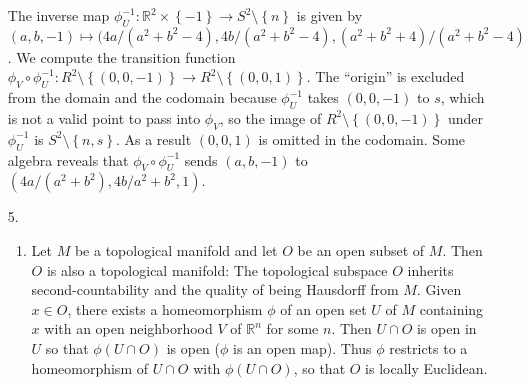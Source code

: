 \documentclass[11pt,leqno]{article}
\theoremstyle{plain}
\theoremstyle{definition}
\numberwithin{equation}{section}
\numberwithin{lem}{section}
\newcommand{\cbr}[1]{\left\{#1\right\}}
\begin{document}
\begin{enumerate}
    The inverse map $\phi_U^{-1}\colon \mathbb R^2\times\cbr{-1}\to S^2\setminus \cbr{n}$ is given by $(a,b,-1)\mapsto (4a/(a^2+b^2-4),4b/(a^2+b^2-4), (a^2+b^2+4)/(a^2+b^2-4)$. We compute the transition function $\phi_V\circ\phi_U^{-1}\colon R^2\setminus\cbr{(0,0,-1)}\to R^2\setminus\cbr{(0,0,1)}$. The ``origin'' is excluded from the domain and the codomain because $\phi_U^{-1}$ takes $(0,0,-1)$ to $s$, which is not a valid point to pass into $\phi_V$, so the image of $R^2\setminus\cbr{(0,0,-1)}$ under $\phi_U^{-1}$ is $S^2\setminus\cbr{n,s}$. As a result $(0,0,1)$ is omitted in the codomain. Some algebra reveals that $\phi_V\circ\phi_U^{-1}$ sends $(a,b,-1)$ to $(4a/(a^2+b^2),4b/a^2+b^2,1)$.
    \item[5.] \begin{enumerate}
      \item Let $M$ be a topological manifold and let $O$ be an open subset of $M$. Then $O$ is also a topological manifold: The topological subspace $O$ inherits second-countability and the quality of being Hausdorff from $M$. Given $x\in O$, there exists a homeomorphism $\phi$ of an open set $U$ of $M$ containing $x$ with an open neighborhood $V$ of $\mathbb R^n$ for some $n$. Then $U\cap O$ is open in $U$ so that $\phi(U\cap O)$ is open ($\phi$ is an open map). Thus $\phi$ restricts to a homeomorphism of $U\cap O$ with $\phi(U\cap O)$, so that $O$ is locally Euclidean. 
      

\end{enumerate}
\end{enumerate}
\end{document}

